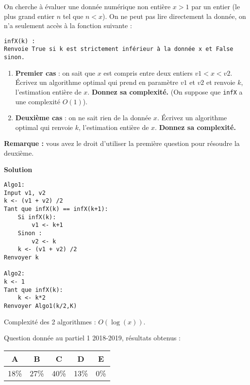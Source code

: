 
\begin{exercice}[Partiel 2018-2019]
On cherche à évaluer une donnée numérique non entière $x > 1$ par un entier (le plus grand entier $n$ tel que $n < x$). On ne peut pas lire
directement la donnée, on n'a seulement accès à la fonction suivante :

\begin{lstlisting}
infX(k) : 
Renvoie True si k est strictement inférieur à la donnée x et False sinon.
\end{lstlisting}


\begin{enumerate}
\item \textbf{Premier cas} : on sait que $x$ est compris entre deux entiers $v1 < x < v2$. \'Ecrivez un algorithme
optimal qui prend en paramètre $v1$ et $v2$ et renvoie $k$, l'estimation entière de $x$. \textbf{Donnez sa complexité.} (On suppose
que {\tt infX} a une complexité $O(1)$).

\item \textbf{Deuxième cas} : on ne sait rien de la donnée $x$.   \'Ecrivez un algorithme
optimal qui renvoie $k$, l'estimation entière de $x$. \textbf{Donnez sa complexité.}
\end{enumerate}

\textbf{Remarque :} vous avez le droit d'utiliser la première question pour résoudre la deuxième.

\textbf{Solution}


\begin{lstlisting}
Algo1:
Input v1, v2
k <- (v1 + v2) /2
Tant que infX(k) == infX(k+1):
    Si infX(k):
        v1 <- k+1
    Sinon :
        v2 <- k
    k <- (v1 + v2) /2
Renvoyer k

Algo2:
k <- 1
Tant que infX(k):
    k <- k*2
Renvoyer Algo1(k/2,K)
\end{lstlisting}

Complexité des 2 algorithmes : $O(\log(x))$.

Question donnée au partiel 1 2018-2019, résultats obtenus :

\begin{tabular}{|c|c|c|c|c|}
\hline
A & B & C & D & E \\ \hline
18\% & 27\% & 40\% & 13\% & 0\% \\ \hline
\end{tabular}

\end{exercice}

